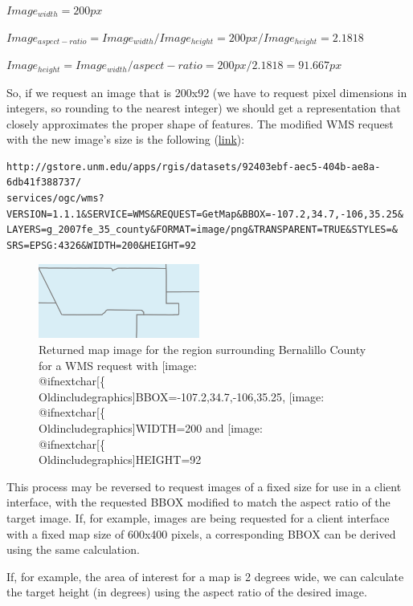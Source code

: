 \documentclass[]{book}
\makeatletter
\def\ScaleIfNeeded{%
  \ifdim\Gin@nat@width>.5\linewidth
    .5\linewidth
  \else
    \Gin@nat@width
  \fi
}
\let\Oldincludegraphics\texttt{[image: \%
 \\catcode`\\@=11\\relax\%
 \%\\gdef\\includegraphics\{\\@ifnextchar[\{\\Oldincludegraphics]}{\Oldincludegraphics[width=\ScaleIfNeeded]}}%
\gdef\texttt{[image: \\@ifnextchar[\{\\Oldincludegraphics]}{\Oldincludegraphics[max size={.75\textwidth}{.75\textheight}]}}%
\makeatother
\begin{document}
\(Image_{width} = 200px\)

\(Image_{aspect-ratio} = Image_{width} / Image_{height} = 200px / Image_{height} = 2.1818\)

\(Image_{height} = Image_{width} / {aspect-ratio} = 200px / 2.1818 = 91.667px\)

So, if we request an image that is 200x92 (we have to request pixel
dimensions in integers, so rounding to the nearest integer) we should
get a representation that closely approximates the proper shape of
features. The modified WMS request with the new image's size is the
following
(\href{http://gstore.unm.edu/apps/rgis/datasets/92403ebf-aec5-404b-ae8a-6db41f388737/services/ogc/wms?VERSION=1.1.1\&SERVICE=WMS\&REQUEST=GetMap\&BBOX=-107.2,34.7,-106,35.25\&LAYERS=g_2007fe_35_county\&FORMAT=image/png\&TRANSPARENT=TRUE\&STYLES=\&SRS=EPSG:4326\&WIDTH=200\&HEIGHT=92}{link}):

\begin{verbatim}
http://gstore.unm.edu/apps/rgis/datasets/92403ebf-aec5-404b-ae8a-6db41f388737/
services/ogc/wms?VERSION=1.1.1&SERVICE=WMS&REQUEST=GetMap&BBOX=-107.2,34.7,-106,35.25&
LAYERS=g_2007fe_35_county&FORMAT=image/png&TRANSPARENT=TRUE&STYLES=&
SRS=EPSG:4326&WIDTH=200&HEIGHT=92
\end{verbatim}

\begin{figure}[htbp]
\centering
\includegraphics{images/bernalillo_02.png}
\caption{Returned map image for the region surrounding Bernalillo County
for a WMS request with \texttt{BBOX=-107.2,34.7,-106,35.25},
\texttt{WIDTH=200} and \texttt{HEIGHT=92}}
\end{figure}

This process may be reversed to request images of a fixed size for use
in a client interface, with the requested BBOX modified to match the
aspect ratio of the target image. If, for example, images are being
requested for a client interface with a fixed map size of 600x400
pixels, a corresponding BBOX can be derived using the same calculation.

If, for example, the area of interest for a map is 2 degrees wide, we
can calculate the target height (in degrees) using the aspect ratio of
the desired image.
\end{document}
